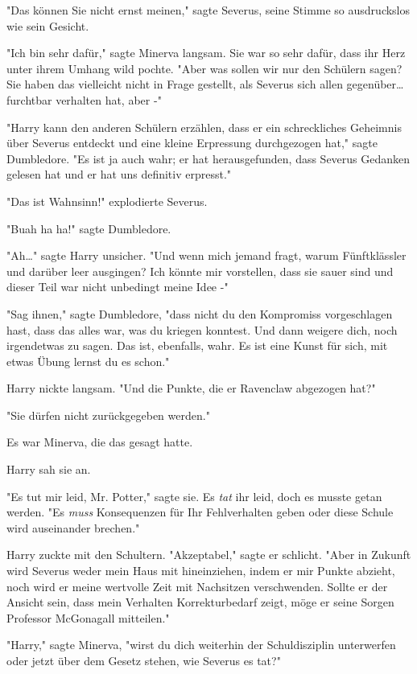 {"Das können Sie nicht ernst meinen," sagte Severus, seine Stimme so ausdruckslos wie sein Gesicht.

"Ich bin sehr dafür," sagte Minerva langsam. Sie war so sehr dafür, dass ihr Herz unter ihrem Umhang wild pochte. "Aber was sollen wir nur den Schülern sagen? Sie haben das vielleicht nicht in Frage gestellt, als Severus sich allen gegenüber… furchtbar verhalten hat, aber -"

"Harry kann den anderen Schülern erzählen, dass er ein schreckliches Geheimnis über Severus entdeckt und eine kleine Erpressung durchgezogen hat," sagte Dumbledore. "Es ist ja auch wahr; er hat herausgefunden, dass Severus Gedanken gelesen hat und er hat uns definitiv erpresst."

"Das ist Wahnsinn!" explodierte Severus.

"Buah ha ha!" sagte Dumbledore.

"Ah…" sagte Harry unsicher. "Und wenn mich jemand fragt, warum Fünftklässler und darüber leer ausgingen? Ich könnte mir vorstellen, dass sie sauer sind und dieser Teil war nicht unbedingt meine Idee -"

"Sag ihnen," sagte Dumbledore, "dass nicht du den Kompromiss vorgeschlagen hast, dass das alles war, was du kriegen konntest. Und dann weigere dich, noch irgendetwas zu sagen. Das ist, ebenfalls, wahr. Es ist eine Kunst für sich, mit etwas Übung lernst du es schon."

Harry nickte langsam. "Und die Punkte, die er Ravenclaw abgezogen hat?"

"Sie dürfen nicht zurückgegeben werden."

Es war Minerva, die das gesagt hatte.

Harry sah sie an.

"Es tut mir leid, Mr. Potter," sagte sie. Es \emph{tat} ihr leid, doch es musste getan werden. "Es \emph{muss} Konsequenzen für Ihr Fehlverhalten geben oder diese Schule wird auseinander brechen."

Harry zuckte mit den Schultern. "Akzeptabel," sagte er schlicht. "Aber in Zukunft wird Severus weder mein Haus mit hineinziehen, indem er mir Punkte abzieht, noch wird er meine wertvolle Zeit mit Nachsitzen verschwenden. Sollte er der Ansicht sein, dass mein Verhalten Korrekturbedarf zeigt, möge er seine Sorgen Professor McGonagall mitteilen."

"Harry," sagte Minerva, "wirst du dich weiterhin der Schuldisziplin unterwerfen oder jetzt über dem Gesetz stehen, wie Severus es tat?"

}
